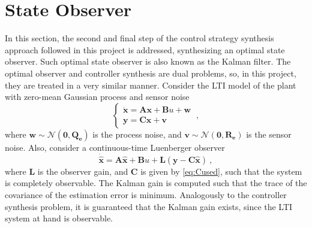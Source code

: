 \documentclass[letterpaper, 10 pt, conference]{ieeeconf}
\begin{document}

\section{State Observer}\label{sec:obs}
In this section, the second and final step of the control strategy synthesis approach followed in this project is addressed, synthesizing an optimal state observer. Such optimal state observer is also known as the Kalman filter. The optimal observer and controller synthesis are dual problems, so, in this project, they are treated in a very similar manner. Consider the LTI model of the plant with zero-mean Gaussian process and sensor noise
\begin{equation*}
\begin{cases}
    \dot{\mathbf{x}} = \mathbf{Ax}+\mathbf{B}u+\mathbf{w}\\
    \mathbf{y} = \mathbf{Cx}+\mathbf{v}
    \end{cases}\:,
\end{equation*}
where $\mathbf{w} \sim \mathcal{N}(\mathbf{0},\mathbf{Q_e})$ is the process noise, and $\mathbf{v} \sim \mathcal{N}(\mathbf{0},\mathbf{R_e})$ is the sensor noise.
Also, consider a continuous-time Luenberger observer 
\begin{equation}\label{eq:luenberguer}
    \dot{\hat{\mathbf{x}}} = \mathbf{A} \hat{\mathbf{x}} + \mathbf{B}u + \mathbf{L}(\mathbf{y} - \mathbf{C}\hat{\mathbf{x}})\:,
\end{equation}
where $\mathbf{L}$ is the observer gain, and $\mathbf{C}$ is given by \eqref{eq:Cused}, such that the system is completely observable. The Kalman gain is computed such that the trace of the covariance of the estimation error is minimum. Analogously to the controller synthesis problem, it is guaranteed that the Kalman gain exists, since the LTI system at hand is observable. 
\end{document}
